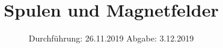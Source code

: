 

\subject{Versuch 308}
\title{Spulen und Magnetfelder}
\date{%
  Durchführung: 26.11.2019
  \hspace{3em}
  Abgabe: 3.12.2019
}



\maketitle
\thispagestyle{empty}
\tableofcontents
\newpage







\nocite{*}
\printbibliography{}


